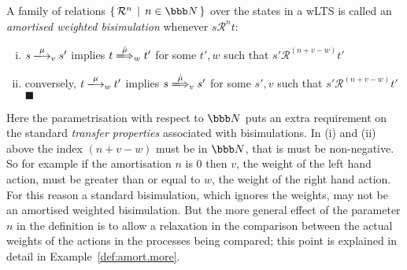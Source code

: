 \documentclass{LMCS}
\newcommand{\nats}{\ensuremath{\bbb N}\xspace}
\newcommand{\setof}[2]{\{ \, #1 \, \mid \, #2 \, \}}\newcommand{\sset}[1]{\{ {#1}  \}  }
\newcommand{\calR}{\mathbin{\mathcal{R}}}
\newcommand{\ar}[1]{\mathbin{\xlongrightarrow{ #1}}}
\newcommand{\dar}[1]{\xLongrightarrow{\vspace{-2em}#1}}
\newcommand{\EndDefBox}{\null\hfill$\blacksquare$}
\newcommand{\boxHere}{\global\let\EndProof\empty\EndDefBox}
\begin{document}
\begin{defi}\label{def:amort}
  A family of relations $\setof{\calR^n}{n \in \nats} $ over the states in
  a wLTS is called an \emph{amortised weighted bisimulation} whenever $ s \calR^n
  t$:
\begin{enumerate}[(i)]
\item $s \ar{\mu}_v s'$ implies $t \dar{\hat{\mu}}_w t'$ for some $t', w$ such that
    $s' \calR^{(n+v-w)} t'$

\item conversely, 
 $t \ar{\mu}_w t'$ implies $s \dar{\hat{\mu}}_v s'$ for some $s', v$ such that
    $s' \calR^{(n+v-w)} t'$  \boxHere
\end{enumerate}
\end{defi}
\noindent
Here the parametrisation with respect to \nats puts an extra
requirement on the standard \emph{transfer properties} associated with
bisimulations. In (i) and (ii) above the index $(n+v-w)$ must be in
\nats, that is must be non-negative. So for example if the
amortisation $n$ is 0 then $v$, the weight of the left hand action,
must be greater than or equal to $w$, the weight of the right hand
action. For this reason a standard bisimulation, which ignores the
weights, may not be an amortised weighted bisimulation. But the more
general effect of the parameter $n$ in the definition is to allow a
relaxation in the comparison between the actual weights of the
actions in the processes being compared; this point is explained in
detail in Example~\ref{def:amort.more}.
\end{document}
